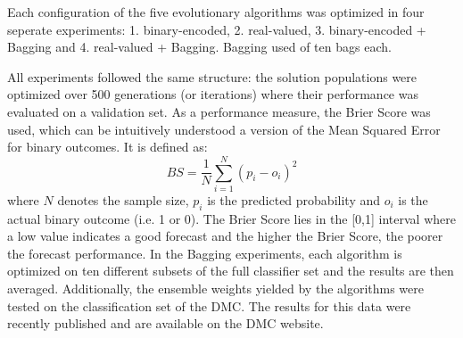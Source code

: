 Each configuration of the five evolutionary algorithms was optimized in four seperate experiments: 1. binary-encoded, 2. real-valued, 3. binary-encoded + Bagging and 4. real-valued + Bagging. Bagging used of ten bags each.

All experiments followed the same structure: the solution populations were optimized over 500 generations (or iterations) where their performance was evaluated on a validation set. As a performance measure, the Brier Score was used, which can be intuitively understood a version of the Mean Squared Error for binary outcomes. It is defined as:
\begin{equation}
BS = \frac{1}{N} \sum_{i = 1}^{N} (p_i - o_i)^2
\end{equation}
where $N$ denotes the sample size, $p_i$ is the predicted probability and $o_i$ is the actual binary outcome (i.e. 1 or 0). The Brier Score lies in the [0,1] interval where a low value indicates a good forecast and the higher the Brier Score, the poorer the forecast performance. In the Bagging experiments, each algorithm is optimized on ten different subsets of the full classifier set and the results are then averaged.
Additionally, the ensemble weights yielded by the algorithms were tested on the classification set of the DMC. The results for this data were recently published and are available on the DMC website.
